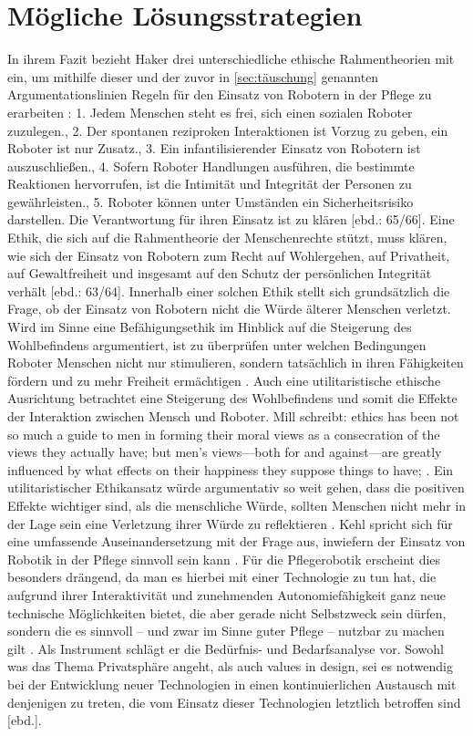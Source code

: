 \section{Mögliche Lösungsstrategien}
\label{sec:lösung}
In ihrem Fazit bezieht Haker drei unterschiedliche ethische Rahmentheorien mit ein, um mithilfe dieser und der zuvor in \ref{sec:täuschung} genannten Argumentationslinien Regeln für den Einsatz von Robotern in der Pflege zu erarbeiten \cite[59]{haker}: 1. Jedem Menschen steht es frei, sich einen \glqq sozialen Roboter \grqq zuzulegen., 2. Der spontanen reziproken Interaktionen ist Vorzug zu geben, ein Roboter ist nur Zusatz., 3. Ein infantilisierender Einsatz von Robotern ist auszuschließen., 4. Sofern Roboter Handlungen ausführen, die bestimmte Reaktionen hervorrufen, ist die Intimität und Integrität der Personen zu gewährleisten., 5. Roboter können unter Umständen ein Sicherheitsrisiko darstellen. Die Verantwortung für ihren Einsatz ist zu klären [ebd.: 65/66]. Eine Ethik, die sich auf die Rahmentheorie der Menschenrechte stützt, muss klären, wie sich der Einsatz von Robotern zum Recht auf Wohlergehen, auf Privatheit, auf Gewaltfreiheit und insgesamt auf den Schutz der persönlichen Integrität verhält [ebd.: 63/64]. Innerhalb einer solchen Ethik stellt sich grundsätzlich die Frage, ob der Einsatz von Robotern nicht die Würde älterer Menschen verletzt. Wird im Sinne eine Befähigungsethik im Hinblick auf die Steigerung des Wohlbefindens argumentiert, ist zu überprüfen \glqq unter welchen Bedingungen Roboter Menschen nicht nur stimulieren, sondern tatsächlich in ihren Fähigkeiten fördern und zu mehr Freiheit ermächtigen \grqq [ebd.: 64]. Auch eine utilitaristische ethische Ausrichtung betrachtet eine Steigerung des Wohlbefindens \cite[8]{mill} und somit die Effekte der Interaktion zwischen Mensch und Roboter. Mill schreibt: \glqq [...] ethics has been not so much a guide to men in forming their moral views as a consecration of the views they actually have; but men’s views—both for and against—are greatly influenced by what effects on their happiness they suppose things to have; \grqq \cite[2]{mill}. Ein utilitaristischer Ethikansatz würde argumentativ so weit gehen, dass die positiven Effekte wichtiger sind, als die menschliche Würde, sollten Menschen nicht mehr in der Lage sein eine Verletzung ihrer Würde zu reflektieren \cite[64]{haker}. Kehl spricht sich für eine umfassende Auseinandersetzung mit der Frage aus, inwiefern der Einsatz von Robotik in der Pflege sinnvoll sein kann \cite[143 ff]{kehl}. \glqq Für die Pflegerobotik erscheint dies besonders drängend, da man es hierbei mit einer Technologie zu tun hat, die aufgrund ihrer Interaktivität und zunehmenden Autonomiefähigkeit ganz neue technische Möglichkeiten bietet, die aber gerade nicht Selbstzweck sein dürfen, sondern die es sinnvoll – und zwar im Sinne guter Pflege – nutzbar zu machen gilt \grqq [ebd.: 144]. Als Instrument schlägt er die Bedürfnis- und Bedarfsanalyse vor. Sowohl was das Thema Privatsphäre angeht, als auch values in design, sei es notwendig bei der Entwicklung neuer Technologien in einen kontinuierlichen Austausch mit denjenigen zu treten, die vom Einsatz dieser Technologien letztlich betroffen sind [ebd.].